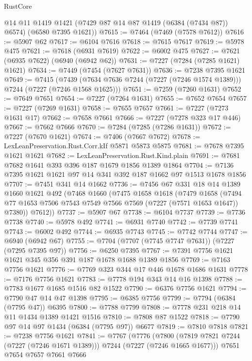\begin{lexlean}{RustCore}
\begin{coremodule}
      @14
      @11
      @1419
      @1421
      (@7429 @87 @14 @87 @1419 (@6384 (@7434 @87)) @6574)
      (@6580 @7395 @1621))
@7615 := @7464 (@7469 (@7578 @7612))
@7616 := @5907 @62
@7617 := @6104 @7616
@7618 := @7615 @7617
@7619 := @5978 @475
@7621 := @7618 (@6931 @7619)
@7622 := @6002 @475
@7627 := @7621 (@6935 @7622) (@6940 (@6942 @62))
@7631 := @7227 (@7284 (@7285 @1621) @1621)
@7634 := @7449 (@7454 (@7627 @7631))
@7636 := @7238 @7395 @1621
@7649 := @7415
    (@7439 (@7634 @7636 @7244 (@7227 (@7246 @1574 @1389))) @7244 (@7227 (@7246 @1568 @1625)))
@7651 := @7259 (@7260 @1631)
@7652 := @7649 @7651
@7654 := @7227 (@7264 @1631)
@7655 := @7652 @7654
@7657 := @7227 (@7269 @1631)
@7658 := @7655 @7657
@7661 := @7227 (@7273 @1631 @17)
@7662 := @7658 @7661
@7666 := @7227 (@7278 @323 @17 @446)
@7667 := @7662 @7666
@7670 := @7284 (@7285 (@7286 @1631))
@7672 := @7227 (@7670 @1621)
@7674 := @7406 (@7667 @7672)
@7678 := LexLeanPreservation.Rust.Corr.kIf @5871 @5873 @5875
@7681 := @7678 @7395 @1621 @1621
@7682 := LexLeanPreservation.Rust.Kind.plain
@7691 := @7681 @7682 @1641 @393 @396 @187 @1679 @1856 @1389 @1864
@7704 := @7136 @7395 @1621 @1621 @97 @14 @341 @392 @187 @1662 @97 @1513 @1678 @1856
@7707 := @7451 @341 @14 @1662
@7736 := @7456
    @67
    @331
    @18
    @14
    @1389
    @1660
    @1621
    @492
    (@7468
      @1660
      (@7475
        @1658
        @1618
        (@7479
          @1658
          (@7494 @77 @1653 @7506 @7543 @7549 @7566 @7569 (@7227 (@7571 @1653 @1647)) @7380))
        @7612))
@7737 := @5907 @67
@7738 := @6104 @7737
@7739 := @7736 @7738
@7740 := @5978 @492
@7741 := @6931 @7740
@7742 := @7739 @7741
@7743 := @6002 @492
@7744 := @6935 @7743
@7745 := @7742 @7744
@7747 := @6940 (@6942 @67)
@7755 := @7704 (@7707 (@7745 @7747 @7631)) (@7227 (@7295 @7395 @97))
@7756 := @6250 @7395
@7767 := @7391 @7756 @1621 @1621 @345 @356 @391 @187 @1678 @1688 @1389 @1856
@7769 := @7163 @7756 @1621
@7776 := @7769 @323 @344 @17 @446 @1678 @1686 @1631
@7778 := @7176 @7756 @1621
@7783 := @7778 @194 @343 @14 @16 @1398
@7788 := @7783 @1677 @1685 @1516 @82 @1522
@7790 := @6376 @7756 @1621
@7794 := @7790 @47 @14 @47 @1398
@7795 := @6385 @7756
@7799 := @7794 (@6384 (@7795 @47)) @6395
@7800 := @7788 @7799
@7808 := @7778 @231 @218 @14 @11 @1434 @1389 @1421 @1516
@7810 := @7808 @87 @1522
@7818 := @7790 @97 @14 @97 @1434 (@6384 (@7795 @97)) @6677
@7819 := @7810 @7818
@7821 := @7238 @7756 @1621
@7841 := @7767
    (@7776
      (@7800 (@7819 @7821 @7244 (@7227 (@7246 @1671 @1389))) @7244 (@7227 (@7246 @1665 @1677)))
      @7651
      @7654
      @7657
      @7661
      @7666

\end{coremodule}
\end{lexlean}
